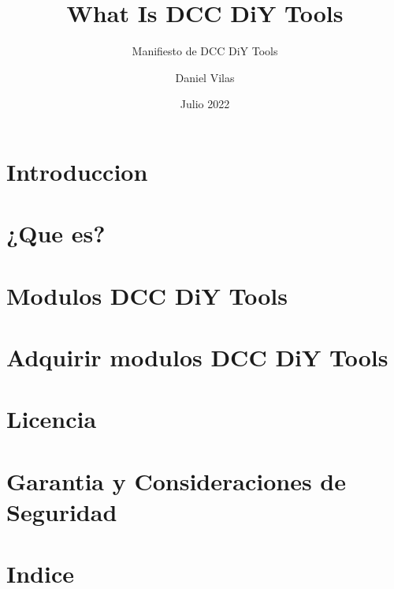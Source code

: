 \documentclass[spanish]{DccDiyTools/DccDiyTools}
\title{What Is DCC DiY Tools}
\subtitle{Manifiesto de DCC DiY Tools}
\author{Daniel Vilas}
\date{Julio 2022}
\begin{document}
\maketitle
\newpage
\section{Introduccion}


\newpage
\section{¿Que es?}


\newpage
\section{Modulos DCC DiY Tools}


\newpage
\section{Adquirir modulos DCC DiY Tools}


\newpage
\section{Licencia}


\newpage
\section{Garantia y Consideraciones de Seguridad}


\newpage
\section{Indice}
\tableofcontents

\listoffigures
\listoftables
\end{document}
